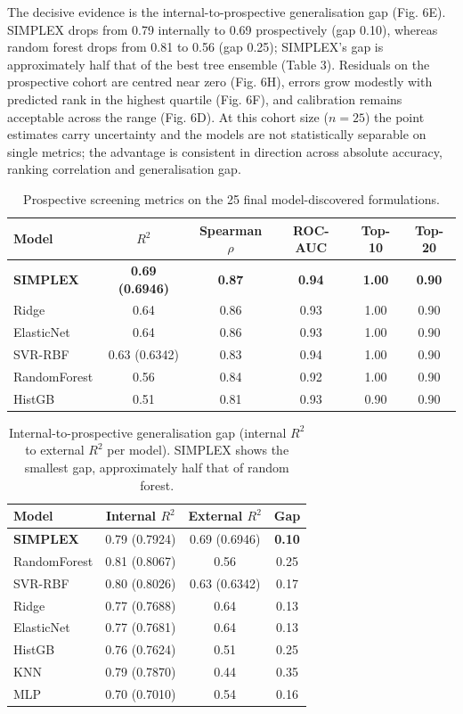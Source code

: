 The decisive evidence is the internal-to-prospective generalisation gap (Fig. 6E). SIMPLEX drops from 0.79 internally to 0.69 prospectively (gap 0.10), whereas random forest drops from 0.81 to 0.56 (gap 0.25); SIMPLEX's gap is approximately half that of the best tree ensemble (Table 3). Residuals on the prospective cohort are centred near zero (Fig. 6H), errors grow modestly with predicted rank in the highest quartile (Fig. 6F), and calibration remains acceptable across the range (Fig. 6D). At this cohort size ($n = 25$) the point estimates carry uncertainty and the models are not statistically separable on single metrics; the advantage is consistent in direction across absolute accuracy, ranking correlation and generalisation gap.

\begin{table}[h]
\centering
\caption{Prospective screening metrics on the 25 final model-discovered formulations.}
\label{tab:ext}
\begin{tabular}{lccccc}
\toprule
Model & $R^2$ & Spearman $\rho$ & ROC-AUC & Top-10 & Top-20 \\
\midrule
\textbf{SIMPLEX} & \textbf{0.69 (0.6946)} & \textbf{0.87} & \textbf{0.94} & \textbf{1.00} & \textbf{0.90} \\
Ridge & 0.64 & 0.86 & 0.93 & 1.00 & 0.90 \\
ElasticNet & 0.64 & 0.86 & 0.93 & 1.00 & 0.90 \\
SVR-RBF & 0.63 (0.6342) & 0.83 & 0.94 & 1.00 & 0.90 \\
RandomForest & 0.56 & 0.84 & 0.92 & 1.00 & 0.90 \\
HistGB & 0.51 & 0.81 & 0.93 & 0.90 & 0.90 \\
\bottomrule
\end{tabular}
\end{table}

\begin{table}[h]
\centering
\caption{Internal-to-prospective generalisation gap (internal $R^2$ to external $R^2$ per model). SIMPLEX shows the smallest gap, approximately half that of random forest.}
\label{tab:gap}
\begin{tabular}{lccc}
\toprule
Model & Internal $R^2$ & External $R^2$ & Gap \\
\midrule
\textbf{SIMPLEX} & 0.79 (0.7924) & 0.69 (0.6946) & \textbf{0.10} \\
RandomForest & 0.81 (0.8067) & 0.56 & 0.25 \\
SVR-RBF & 0.80 (0.8026) & 0.63 (0.6342) & 0.17 \\
Ridge & 0.77 (0.7688) & 0.64 & 0.13 \\
ElasticNet & 0.77 (0.7681) & 0.64 & 0.13 \\
HistGB & 0.76 (0.7624) & 0.51 & 0.25 \\
KNN & 0.79 (0.7870) & 0.44 & 0.35 \\
MLP & 0.70 (0.7010) & 0.54 & 0.16 \\
\bottomrule
\end{tabular}
\end{table}

